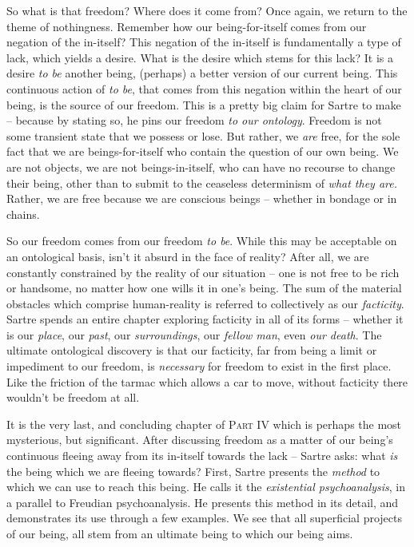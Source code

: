 So what is that freedom? Where does it come from? Once again, we return to the theme of nothingness. Remember how our being-for-itself comes from our negation of the in-itself? This negation of the in-itself is fundamentally a type of lack, which yields a desire. What is the desire which stems for this lack? It is a desire \emph{to be} another being, (perhaps) a better version of our current being. This continuous action of \emph{to be}, that comes from this negation within the heart of our being, is the source of our freedom. This is a pretty big claim for Sartre to make -- because by stating so, he pins our freedom \emph{to our ontology}. Freedom is not some transient state that we possess or lose. But rather, we \emph{are} free, for the sole fact that we are beings-for-itself who contain the question of our own being. We are not objects, we are not beings-in-itself, who can have no recourse to change their being, other than to submit to the ceaseless determinism of \emph{what they are.} Rather, we are free because we are conscious beings -- whether in bondage or in chains.

So our freedom comes from our freedom \emph{to be}. While this may be acceptable on an ontological basis, isn't it absurd in the face of reality? After all, we are constantly constrained by the reality of our situation -- one is not free to be rich or handsome, no matter how one wills it in one's being. The sum of the material obstacles which comprise human-reality is referred to collectively as our \emph{facticity}. Sartre spends an entire chapter exploring facticity in all of its forms -- whether it is our \emph{place}, our \emph{past}, our \emph{surroundings}, our \emph{fellow man}, even \emph{our death}. The ultimate ontological discovery is that our facticity, far from being a limit or impediment to our freedom, is \emph{necessary} for freedom to exist in the first place. Like the friction of the tarmac which allows a car to move, without facticity there wouldn't be freedom at all. 

It is the very last, and concluding chapter of \textsc{Part IV} which is perhaps the most mysterious, but significant. After discussing freedom as a matter of our being's continuous fleeing away from its in-itself towards the lack -- Sartre asks: what \emph{is} the being which we are fleeing towards? First, Sartre presents the \emph{method} to which we can use to reach this being. He calls it the \emph{existential psychoanalysis}, in a parallel to Freudian psychoanalysis. He presents this method in its detail, and demonstrates its use through a few examples. We see that all superficial projects of our being, all stem from an ultimate being to which our being aims.

